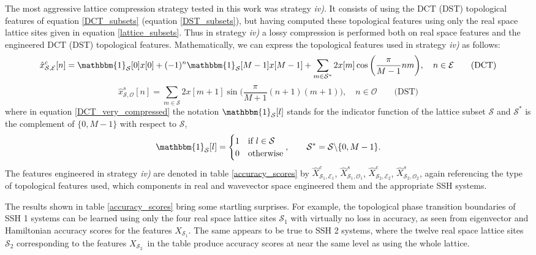 \documentclass[10pt]{revtex4-1}
\newcommand{\indicator}[1]{\mathbbm{1}_{\mathcal{#1}}}
\newcommand\xSOne{$X_{\mathcal{S}_1}$}
\newcommand\xcSEOne{$\hat{X}^c_{\mathcal{S}_1,\mathcal{E}_1}$}
\newcommand\xsSOOne{$\hat{X}^s_{\mathcal{S}_1,\mathcal{O}_1}$}
\newcommand\xSTwo{$X_{\mathcal{S}_2}$}
\newcommand\xcSETwo{$\hat{X}^c_{\mathcal{S}_2,\mathcal{E}_2}$}
\newcommand\xsSOTwo{$\hat{X}^s_{\mathcal{S}_2,\mathcal{O}_2}$}
\begin{document}
The most aggressive lattice compression strategy tested in this work was strategy \emph{iv)}. It consists of using the DCT (DST) topological features of equation \eqref{DCT_subsets} (equation \eqref{DST_subsets}), but having computed these topological features using only the real space lattice sites given in equation \eqref{lattice_subsets}. Thus in strategy \emph{iv)} a lossy compression is performed both on real space features and the engineered DCT (DST) topological features. Mathematically, we can express the topological features used in strategy \emph{iv)} as follows:
\begin{equation}
\label{DCT_very_compressed}
\hat{x}_{\mathcal{S}, \mathcal{E}}^c[n] = \indicator{\mathcal{S}}[0]x[0] + (-1)^n\indicator{\mathcal{S}}[M-1] x[M-1] + \sum_{m \in \mathcal{S}^*} 2x[m]\cos\bigg(\frac{\pi}{M-1}nm\bigg), \quad n \in \mathcal{E} \qquad \text{(DCT)} 
\end{equation}
\begin{equation}
\label{DST_very_compressed}
\hat{x}_{\mathcal{S}, \mathcal{O}}^s[n] = \sum_{m \in \mathcal{S}}2x[m+1]\sin\bigg(\frac{\pi}{M+1}(n+1)(m+1)\bigg), \quad n \in \mathcal{O} \qquad \text{(DST)}
\end{equation}
where in equation \eqref{DCT_very_compressed} the notation $\mathbbm{1}_{\mathcal{S}}[l]$ stands for the indicator function of the lattice subset $\mathcal{S}$ and $\mathcal{S}^*$ is the complement of $\{0,M-1\}$ with respect to $\mathcal{S}$, 
\begin{equation}
\label{indicator_function}
\indicator{\mathcal{S}}[l] = \begin{cases}
      1 & \text{if } l \in \mathcal{S} \\
      0 & \text{otherwise}
    \end{cases}, \qquad \mathcal{S}^* = \mathcal{S}{\backslash} \{0,M-1\}.
\end{equation}
The features engineered in strategy \emph{iv)} are denoted in table \ref{accuracy_scores} by \xcSEOne, \xsSOOne, \xcSETwo, \xsSOTwo, again referencing the type of topological features used, which components in real and wavevector space engineered them and the appropriate SSH systems. 

The results shown in table \ref{accuracy_scores} bring some startling surprises. For example, the topological phase transition boundaries of SSH 1 systems can be learned using only the four real space lattice sites $\mathcal{S}_1$ with virtually no loss in accuracy, as seen from eigenvector and Hamiltonian accuracy scores for the features \xSOne. The same appears to be true to SSH 2 systems, where the twelve real space lattice sites $\mathcal{S}_2$ corresponding to the features \xSTwo\ in the table produce accuracy scores at near the same level as using the whole lattice.    
\end{document}

